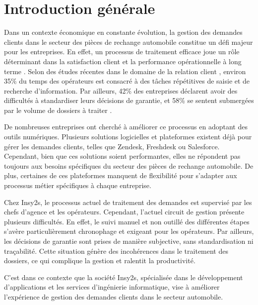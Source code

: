 \chapter*{Introduction g\'{e}n\'{e}rale}

\indent Dans un contexte \'{e}conomique en constante \'{e}volution, la gestion des demandes clients dans le secteur des pi\`{e}ces de rechange automobile constitue un d\'{e}fi majeur pour les entreprises. En effet, un processus de traitement efficace joue un r\^{o}le d\'{e}terminant dans la satisfaction client et la performance op\'{e}rationnelle \`{a} long terme \cite{microservices}. Selon des \'{e}tudes r\'{e}centes dans le domaine de la relation client \cite{rag}, environ 35\% du temps des op\'{e}rateurs est consacr\'{e} \`{a} des t\^{a}ches r\'{e}p\'{e}titives de saisie et de recherche d'information. Par ailleurs, 42\% des entreprises d\'{e}clarent avoir des difficult\'{e}s \`{a} standardiser leurs d\'{e}cisions de garantie, et 58\% se sentent submerg\'{e}es par le volume de dossiers \`{a} traiter \cite{whisper}.

\indent De nombreuses entreprises ont cherch\'{e} \`{a} am\'{e}liorer ce processus en adoptant des outils num\'{e}riques. Plusieurs solutions logicielles et plateformes existent d\'{e}j\`{a} pour g\'{e}rer les demandes clients, telles que Zendesk, Freshdesk ou Salesforce. Cependant, bien que ces solutions soient performantes, elles ne r\'{e}pondent pas toujours aux besoins sp\'{e}cifiques du secteur des pi\`{e}ces de rechange automobile. De plus, certaines de ces plateformes manquent de flexibilit\'{e} pour s'adapter aux processus m\'{e}tier sp\'{e}cifiques \`{a} chaque entreprise.

\indent Chez Insy2s, le processus actuel de traitement des demandes est supervis\'{e} par les chefs d'agence et les op\'{e}rateurs. Cependant, l'actuel circuit de gestion pr\'{e}sente plusieurs difficult\'{e}s. En effet, le suivi manuel et non outill\'{e} des diff\'{e}rentes \'{e}tapes s'av\`{e}re particuli\`{e}rement chronophage et exigeant pour les op\'{e}rateurs. Par ailleurs, les d\'{e}cisions de garantie sont prises de mani\`{e}re subjective, sans standardisation ni tra\c{c}abilit\'{e}. Cette situation g\'{e}n\`{e}re des incoh\'{e}rences dans le traitement des dossiers, ce qui complique la gestion et ralentit la productivit\'{e}.

\indent C'est dans ce contexte que la soci\'{e}t\'{e} Insy2s, sp\'{e}cialis\'{e}e dans le d\'{e}veloppement d'applications et les services d'ing\'{e}nierie informatique, vise \`{a} am\'{e}liorer l'exp\'{e}rience de gestion des demandes clients dans le secteur automobile.

